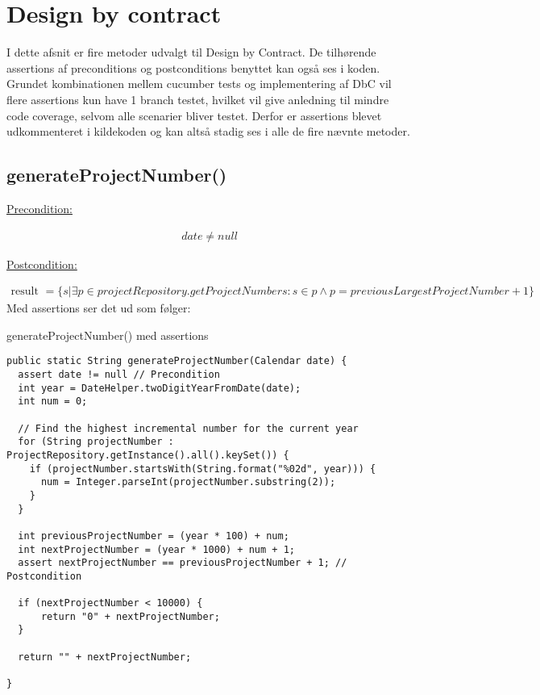 \section{Design by contract}\label{chap:design_by_contract}
I dette afsnit er fire metoder udvalgt til Design by Contract. De tilhørende assertions af preconditions og postconditions benyttet kan også ses i koden.\newline
Grundet kombinationen mellem cucumber tests og implementering af DbC vil flere assertions kun have 1 branch testet, hvilket vil give anledning til mindre code coverage, selvom alle scenarier bliver testet. Derfor er assertions blevet udkommenteret i kildekoden og kan altså stadig ses i alle de fire nævnte metoder.
\subsection{generateProjectNumber()} \label{sec:contract_generate_project_number}
\underline{Precondition:}
\vspace{4pt}

\begin{align}
  date \neq null
\end{align}
\vspace{4pt}

\noindent
\underline{Postcondition:}
\vspace{4pt}

\begin{align}
  \text{result } = \{s|\exists p \in projectRepository.getProjectNumbers : s \in p \land p = previousLargestProjectNumber + 1\}
\end{align}
\newline
\noindent
Med assertions ser det ud som følger:
\begin{listing}[H]
  \centering
  \caption{generateProjectNumber() med assertions}\label{lst:cgenerate_project_number_assertions}
  \begin{verbatim}
public static String generateProjectNumber(Calendar date) {
  assert date != null // Precondition
  int year = DateHelper.twoDigitYearFromDate(date);
  int num = 0;

  // Find the highest incremental number for the current year
  for (String projectNumber : ProjectRepository.getInstance().all().keySet()) {
    if (projectNumber.startsWith(String.format("%02d", year))) {
      num = Integer.parseInt(projectNumber.substring(2));
    }
  }

  int previousProjectNumber = (year * 100) + num;
  int nextProjectNumber = (year * 1000) + num + 1;
  assert nextProjectNumber == previousProjectNumber + 1; // Postcondition
  
  if (nextProjectNumber < 10000) {
      return "0" + nextProjectNumber;
  }

  return "" + nextProjectNumber;

}
    \end{verbatim}
\end{listing}
